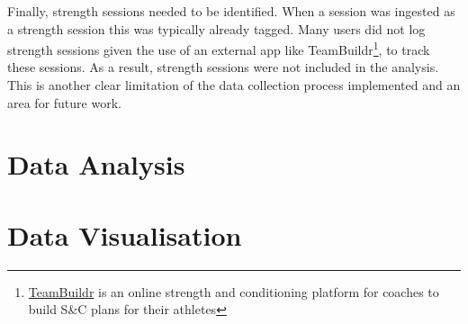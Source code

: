 Finally, strength sessions needed to be identified. When a session was ingested as a strength session this was typically already tagged. Many users did not log strength sessions given the use of an external app like TeamBuildr\footnote{\href{https://www.teambuildr.com/}{TeamBuildr} is an online strength and conditioning platform for coaches to build S\&C plans for their athletes}, to track these sessions. As a result, strength sessions were not included in the analysis. This is another clear limitation of the data collection process implemented and an area for future work.

\section{Data Analysis}

\section{Data Visualisation}